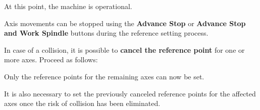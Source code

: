 At this point, the machine is operational.

\notes

Axis movements can be stopped using the \textbf{Advance Stop} or \textbf{Advance Stop and Work Spindle} buttons during the reference setting process.

In case of a collision, it is possible to \textbf{cancel the reference point} for one or more axes. Proceed as follows:

\begin{itemize}
\end{itemize}
\begin{itemize}
\end{itemize}


\begin{itemize}
\end{itemize}

\vspace{.5cm}

\begin{itemize}
\end{itemize}

Only the reference points for the remaining axes can now be set.

It is also necessary to set the previously canceled reference points for the affected axes once the risk of collision has been eliminated.